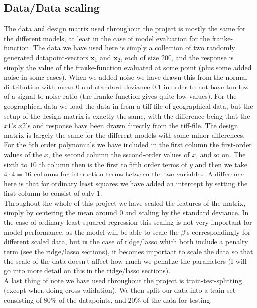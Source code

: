 \documentclass{article}
\begin{document}
\subsection{Data/Data scaling}
The data and design matrix used throughout the project is mostly the same for
the different models, at least in the case of model evaluation for the
franke-function. The data we have used here is simply a collection of two
randomly generated datapoint-vectors $\mathbf{x}_1$ and $\mathbf{x}_2$, each of
size $200$, and the response is simply the value of the franke-function
evaluated at some point (plus some added noise in some cases). When we added
noise we have drawn this from the normal distribution with mean $0$ and
standard-deviance $0.1$ in order to not have too low of a signal-to-noise-ratio
(the franke-function gives quite low values). For the geographical data we load
the data in from a tiff file of geographical data, but the setup of the design
matrix is exactly the same, with the difference being that the $x1$'s $x2$'s and
response have been drawn directly from the tiff-file. The design matrix is
largely the same for the different models with some minor differences.  For the
$5$th order polynomials we have included in the first column the first-order
values of the $x$, the second column the second-order values of $x$, and so on.
The sixth to $10$ th column then is the first to fifth order terms of $y$ and
then we take $4 \cdot 4 = 16$ columns for interaction terms between the two
variables. A difference here is that for ordinary least squares we have added an
intercept by setting the first column to consist of only $1$.
\\
Throughout the whole of this project we have scaled the
features of the matrix, simply by centering the mean around $0$ and scaling by
the standard deviance. In the case of ordinary least squared regression this
scaling is not very important for model performance, as the model will be able
to scale the $\beta$'s correspondingly for different scaled data, but in the
case of ridge/lasso which both include a penalty term (see the ridge/lasso
sections), it becomes important to scale the data so that the scale of the data
doesn't affect how much we penalize the parameters (I will go into more detail
on this in the ridge/lasso sections).
\\
A last thing of note we have used throughout the project is train-test-splitting
(except when doing cross-validation). We then split our data into a train set
consisting of $80\%$ of the datapoints, and $20\%$ of the data for testing.
\end{document}

